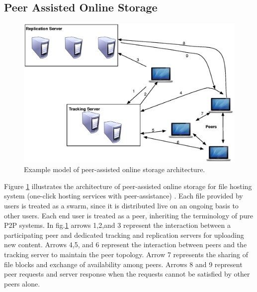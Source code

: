 \documentclass[conference]{IEEEtran}
\begin{document}
\subsection{Peer Assisted Online Storage}

\begin{figure}[thb]
\begin{center}
\includegraphics[scale=0.4]{graphs/fs2you-arch.eps}
\end{center}
\caption{Example model of peer-assisted online storage architecture.}
\label{fig:fs2you}
\end{figure} 

Figure \ref{fig:fs2you} illustrates the architecture of peer-assisted online storage for file hosting system (one-click hosting services with peer-assistance) \cite{5061997}.
Each file provided by users is treated as a swarm, since it is distributed live on an ongoing basis to other users. 
Each end user is treated as a peer, inheriting the terminology of pure P2P systems.
In fig.\ref{fig:fs2you} arrows 1,2,and 3 represent the interaction between a participating peer and dedicated tracking and replication servers for uploading new content.
Arrows 4,5, and 6 represent the interaction between peers and the tracking server to maintain the peer topology. 
Arrow 7 represents the sharing of file blocks and exchange of availability among peers. 
Arrows 8 and 9 represent peer requests and server response when the requests cannot be satisfied by other peers alone. 
\end{document}
